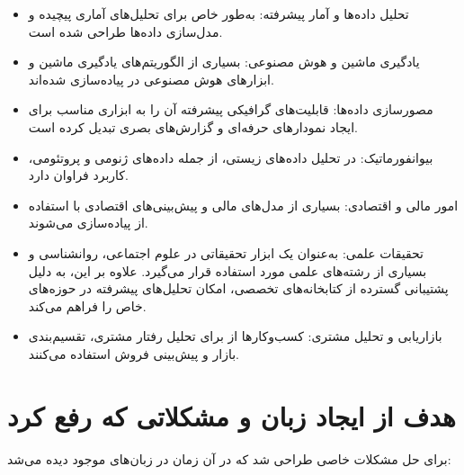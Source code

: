 \documentclass[11pt, a4paper, oneside]{book}
\begin{document}
			\begin{itemize}
				
				\item {\large تحلیل داده‌ها و آمار پیشرفته}: 
				{\normalsize به‌طور خاص برای تحلیل‌های آماری پیچیده و مدل‌سازی داده‌ها طراحی شده است.}
				
				\item {\large یادگیری ماشین و هوش مصنوعی}:
				{\normalsize بسیاری از الگوریتم‌های یادگیری ماشین و ابزارهای هوش مصنوعی در پیاده‌سازی شده‌اند.}
				
				\item {\large مصورسازی داده‌ها}:
				{\normalsize قابلیت‌های گرافیکی پیشرفته آن را به ابزاری مناسب برای ایجاد نمودارهای حرفه‌ای و گزارش‌های بصری تبدیل کرده است.}
				
				\item {\large بیوانفورماتیک}:
				{\normalsize در تحلیل داده‌های زیستی، از جمله داده‌های ژنومی و پروتئومی، کاربرد فراوان دارد.}
				
				\item {\large امور مالی و اقتصادی}:
				{\normalsize بسیاری از مدل‌های مالی و پیش‌بینی‌های اقتصادی با استفاده از  پیاده‌سازی می‌شوند.}
				
				\item {\large تحقیقات علمی}:
				{\normalsize به‌عنوان یک ابزار تحقیقاتی در علوم اجتماعی، روانشناسی و بسیاری از رشته‌های علمی مورد استفاده قرار می‌گیرد.
					علاوه بر این،  به دلیل پشتیبانی گسترده از کتابخانه‌های تخصصی، امکان تحلیل‌های پیشرفته در حوزه‌های خاص را فراهم می‌کند.}
					
				\item {\large بازاریابی و تحلیل مشتری}:
				{\normalsize کسب‌وکارها از برای تحلیل رفتار مشتری، تقسیم‌بندی بازار و پیش‌بینی فروش استفاده می‌کنند.
				}
				
			\end{itemize}
			
			
		\section{هدف از ایجاد زبان و مشکلاتی که رفع کرد}
		
		 	 برای حل مشکلات خاصی طراحی شد که در آن زمان در زبان‌های موجود دیده می‌شد:
			
\end{document}
